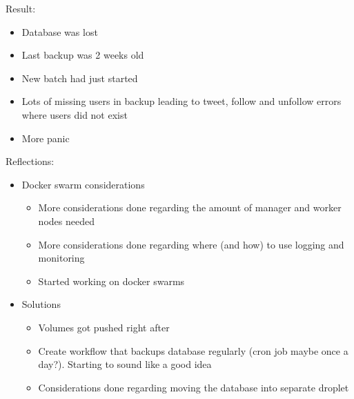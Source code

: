 \begin{enumerate}
    Result:
    \begin{itemize}
        \item Database was lost
        \item Last backup was 2 weeks old
        \item New batch had just started
        \item Lots of missing users in backup leading to tweet, follow and unfollow errors where users did not exist
        \item More panic
    \end{itemize}
    
    Reflections:
    \begin{itemize}
        \item Docker swarm considerations
        \begin{itemize}
            \item More considerations done regarding the amount of manager and worker nodes needed
            \item More considerations done regarding where (and how) to use logging and monitoring
            \item Started working on docker swarms
        \end{itemize}
        \item Solutions
        \begin{itemize}
            \item Volumes got pushed right after
            \item Create workflow that backups database regularly (cron job maybe once a day?). Starting to sound like a good idea
            \item Considerations done regarding moving the database into separate droplet
        \end{itemize}
    \end{itemize}
\end{enumerate}
